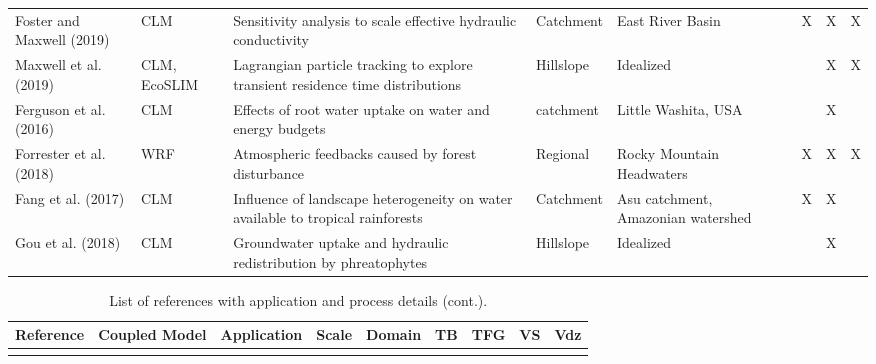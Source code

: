 {\begin{table}
\begin{tabular}{ l  p{1.5cm} p{2cm} p{1.5cm} p{1.5cm} | c | c | c | c }
\cite{Foster2019} Foster and Maxwell (2019) & CLM & Sensitivity analysis to scale effective hydraulic conductivity & Catchment & East River Basin & &X &X &X \\
\cite{Maxwell2019} Maxwell et al. (2019) & CLM, EcoSLIM & Lagrangian particle tracking to explore transient residence time distributions & Hillslope & Idealized & & &X &X \\
\cite{Ferguson2016} Ferguson et al. (2016) & CLM & Effects of root water uptake on water and energy budgets & catchment & Little Washita, USA & & &X & \\									
\cite{Forrester2018} Forrester et al. (2018) & WRF & Atmospheric feedbacks caused by forest disturbance & Regional & Rocky Mountain Headwaters & &X &X &X \\						
\cite{Fang2017} Fang et al. (2017) & CLM & Influence of landscape heterogeneity on water available to tropical rainforests & Catchment & Asu catchment, Amazonian watershed & &X &X & \\
\cite{Gou2018} Gou et al. (2018) & CLM & Groundwater uptake and hydraulic redistribution by phreatophytes & Hillslope & Idealized & & &X & \\

\end{tabular}
\label{pfref10}
\end{table}


\begin{table} \center
\renewcommand{\arraystretch}{2.5}
\center
\caption{List of \parflow{} references with application and process details (cont.).}
\begin{tabular}{ l  p{1.5cm} p{2cm} p{1.5cm} p{1.5cm} | c | c | c | c }
\bf{Reference} & \bf{Coupled Model} & \bf{Application} & \bf{Scale} & \bf{Domain} & \bf{TB} & \bf{TFG} & \bf{VS} & \bf{Vdz} \\   
\hline{}
										

\end{tabular}
\end{table}}
